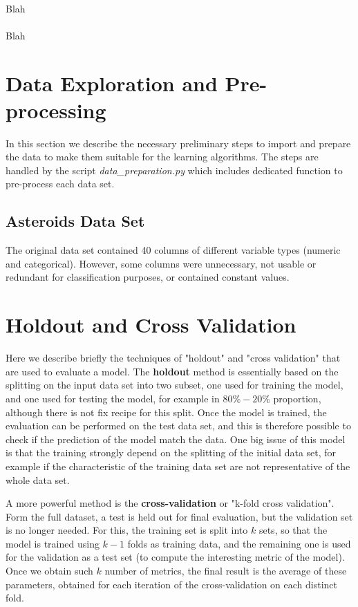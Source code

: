\documentclass{article}
\begin{document}
\paragraph{} 
Blah
\paragraph{} 
Blah

\section{Data Exploration and Pre-processing}
In this section we describe the necessary preliminary steps to import and prepare the data to make them suitable for the learning algorithms.
The steps are handled by the script \textit{data\_preparation.py} which includes dedicated function to pre-process each data set.

\subsection{Asteroids Data Set}
The original data set contained 40 columns of different variable types (numeric and categorical). However, some columns were unnecessary, not usable or redundant for classification purposes, or contained constant values. 



\section{Holdout and Cross Validation}
Here we describe briefly the techniques of "holdout" and "cross validation" that are used to evaluate a model. The \textbf{holdout} method is essentially based on the splitting on the input data set into two subset, one used for training the model, and one used for testing the model, for example in $80\%-20\%$ proportion, although there is not fix recipe for this split. Once the model is trained, the evaluation can be performed on the test data set, and this is therefore possible to check if the prediction of the model match the data. One big issue of this model is that the training strongly depend on the splitting of the initial data set, for example if the characteristic of the training data set are not representative of the whole data set. 

A more powerful method is the \textbf{cross-validation} or "k-fold cross validation". Form the full dataset, a test is held out for final evaluation, but the validation set is no longer needed. For this, the training set is split into $k$ sets, so that the model is trained using $k-1$ folds as training data, and the remaining one is used for the validation as a test set (to compute the interesting metric of the model).
Once we obtain such $k$ number of metrics, the final result is the average of these parameters, obtained for each iteration of the cross-validation on each distinct fold. 
\end{document}
